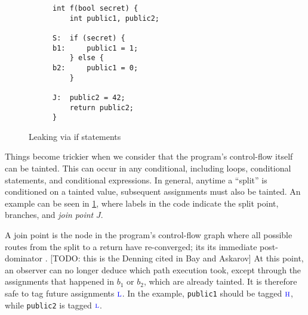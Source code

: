 \documentclass{llncs}
\begin{document}
\begin{figure}[t]
  \begin{subfigure}{0.49\textwidth}
\begin{verbatim}
int f(bool secret) {
    int public1, public2;

S:  if (secret) {
b1:     public1 = 1;
    } else {
b2:     public1 = 0;
    }

J:  public2 = 42;
    return public2;
}
\end{verbatim}
  \end{subfigure}
  \begin{subfigure}{0.5\textwidth}
  \end{subfigure}
\caption{Leaking via if statements}
\label{fig:ifthenelse}  
\end{figure}

Things become trickier when we consider that the program's control-flow itself can be tainted.
This can occur in any conditional, including loops, conditional statements, and conditional expressions.
In general, anytime a ``split'' is conditioned on a tainted value, subsequent assignments must also be tainted.
An example can be seen in \cref{fig:ifthenelse}, where labels in the code indicate the split
point, branches, and {\em join point} \(J\).

A join point is the node in the program's control-flow graph where all possible routes
from the split to a return have re-converged; its its immediate post-dominator \cite{}.
[TODO: this is the Denning cited in Bay and Askarov] At this point, an observer can no
longer deduce which path execution took, except through the assignments that happened
in \(b_1\) or \(b_2\), which are already tainted. It is therefore safe to tag future
assignments \(\textnormal{\color{blue} \sc l}\). In the example, {\tt public1} should be tagged \(\textnormal{\color{blue} \sc h}\), while
{\tt public2} is tagged \(\textnormal{\color{blue} \sc l}\).
\end{document}
